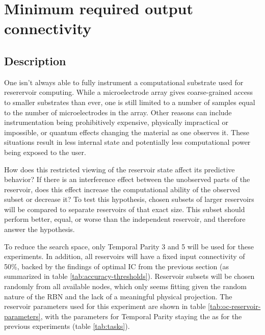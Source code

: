 \section{Minimum required output connectivity}

\subsection{Description}

One isn't always able to fully instrument a computational substrate used for reserervoir computing.
While a microelectrode array gives coarse-grained access to smaller substrates than ever,
one is still limited to a number of samples equal to the number of microelectrodes in the array.
Other reasons can include instrumentation being prohibitively expensive,
physically impractical or impossible,
or quantum effects changing the material as one observes it.
These situations result in less internal state and potentially less computational power being exposed to the user.

How does this restricted viewing of the reservoir state affect its predictive behavior?
If there is an interference effect between the unobserved parts of the reservoir,
does this effect increase the computational ability of the observed subset or decrease it?
To test this hypothesis,
chosen subsets of larger reservoirs will be compared to separate reservoirs of that exact size.
This subset should perform better, equal, or worse than the independent reservoir, and therefore answer the hypothesis.

To reduce the search space, only Temporal Parity 3 and 5 will be used for these experiments.
In addition, all reservoirs will have a fixed input connectivity of 50\%,
backed by the findings of optimal IC from the previous section (as summarized in table \ref{tab:accuracy-thresholds}).
Reservoir subsets will be chosen randomly from all available nodes,
which only seems fitting given the random nature of the RBN and the lack of a meaningful physical projection.
The reservoir parameters used for this experiment are shown in table \ref{tab:oc-reservoir-parameters},
with the parameters for Temporal Parity staying the as for the previous experiments (table \ref{tab:tasks}).

